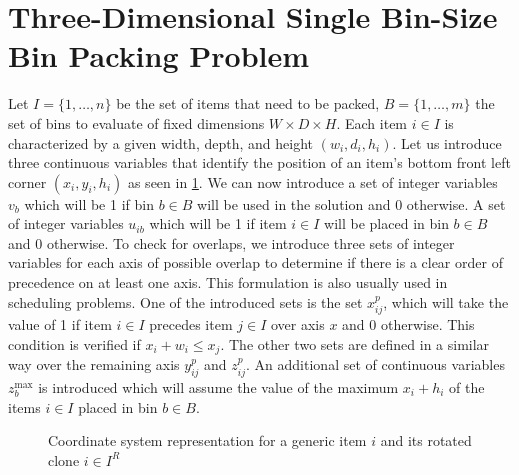 \section{Three-Dimensional Single Bin-Size Bin Packing Problem}
\label{sec:milp}%
Let $I = \{1,\dots, n \}$ be the set of items that need to be packed, $B = \{1,\dots, m \}$ the set of bins to evaluate of fixed dimensions $W \times D \times H$.
Each item $i \in I$ is characterized by a given width, depth, and height $(w_i, d_i, h_i)$.
Let us introduce three continuous variables that identify the position of an item's bottom front left corner $(x_i, y_i, h_i)$ as seen in \cref{fig:coordinate_system}.
We can now introduce a set of integer variables $v_{b}$ which will be 1 if bin $b \in B$ will be used in the solution and 0 otherwise. A set of integer variables $u_{ib}$ which will be 1 if item $i \in I$ will be placed in bin $b \in B$ and 0 otherwise.
To check for overlaps, we introduce three sets of integer variables for each axis of possible overlap to determine if there is a clear order of precedence on at least one axis. This formulation is also usually used in scheduling problems.
One of the introduced sets is the set $x^p_{ij}$, which will take the value of 1 if item $i \in I$ precedes item $j \in I$ over axis $x$ and 0 otherwise. This condition is verified if $x_i + w_i \le x_j$.
The other two sets are defined in a similar way over the remaining axis $y^p_{ij}$ and $z^p_{ij}$.
An additional set of continuous variables $z_b^\text{max}$ is introduced which will assume the value of the maximum $x_i + h_i$ of the items $i \in I$ placed in bin $b \in B$.

\begin{figure}
    \scalebox{0.62}{%
    
    }
    \caption{Coordinate system representation for a generic item $i$ and its rotated clone $i \in I^R$}
    \label{fig:coordinate_system}
\end{figure}


